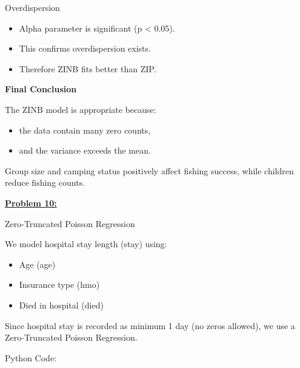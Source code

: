 \documentclass[
]{article}
\begin{document}
Overdispersion

\begin{itemize}
\item
  Alpha parameter is significant (p \textless{} 0.05).
\item
  This confirms overdispersion exists.
\item
  Therefore ZINB fits better than ZIP.
\end{itemize}

\textbf{Final Conclusion}

The ZINB model is appropriate because:

\begin{itemize}
\item
  the data contain many zero counts,
\item
  and the variance exceeds the mean.
\end{itemize}

Group size and camping status positively affect fishing success, while
children reduce fishing counts.

\textbf{\ul{Problem 10:}}

Zero-Truncated Poisson Regression

We model hospital stay length (stay) using:

\begin{itemize}
\item
  Age (age)
\item
  Insurance type (hmo)
\item
  Died in hospital (died)
\end{itemize}

Since hospital stay is recorded as minimum 1 day (no zeros allowed), we
use a Zero-Truncated Poisson Regression.

Python Code:
\end{document}
